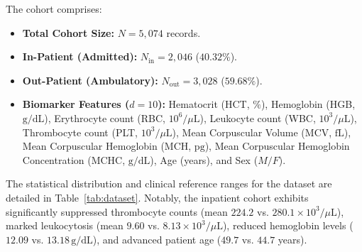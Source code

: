 \documentclass[conference]{IEEEtran}
\begin{document}
The cohort comprises:
\begin{itemize}
    \item \textbf{Total Cohort Size:} $N = 5,074$ records.
    \item \textbf{In-Patient (Admitted):} $N_{\text{in}} = 2,046$ ($40.32\%$).
    \item \textbf{Out-Patient (Ambulatory):} $N_{\text{out}} = 3,028$ ($59.68\%$).
    \item \textbf{Biomarker Features ($d=10$):} Hematocrit (HCT, $\%$), Hemoglobin (HGB, $\text{g/dL}$), Erythrocyte count (RBC, $10^6/\mu\text{L}$), Leukocyte count (WBC, $10^3/\mu\text{L}$), Thrombocyte count (PLT, $10^3/\mu\text{L}$), Mean Corpuscular Volume (MCV, $\text{fL}$), Mean Corpuscular Hemoglobin (MCH, $\text{pg}$), Mean Corpuscular Hemoglobin Concentration (MCHC, $\text{g/dL}$), Age (years), and Sex ($M/F$).
\end{itemize}

The statistical distribution and clinical reference ranges for the dataset are detailed in Table~\ref{tab:dataset}. Notably, the inpatient cohort exhibits significantly suppressed thrombocyte counts (mean $224.2$ vs. $280.1\times 10^3/\mu\text{L}$), marked leukocytosis (mean $9.60$ vs. $8.13\times 10^3/\mu\text{L}$), reduced hemoglobin levels ($12.09$ vs. $13.18\,\text{g/dL}$), and advanced patient age ($49.7$ vs. $44.7$ years).
\end{document}
